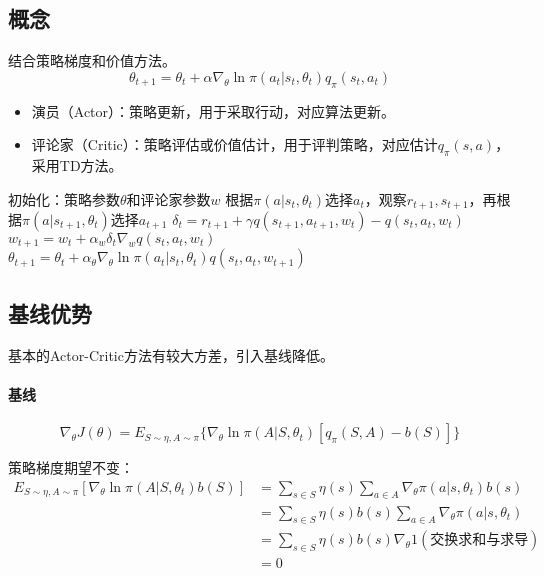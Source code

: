 \documentclass[
12pt, %
a4paper, 
oneside, %
headinclude,footinclude, %
]{scrartcl}
\begin{document}
\subsection[概念]{概念}
结合策略梯度和价值方法。
$$ \theta_{t + 1} = \theta_t + \alpha \nabla_\theta \ln \pi(a_t|s_t, \theta_t) q_\pi(s_t, a_t) $$
\begin{itemize}
\item 演员（Actor）：策略更新，用于采取行动，对应算法更新。
\item 评论家（Critic）：策略评估或价值估计，用于评判策略，对应估计$ q_{\pi}(s, a) $，采用TD方法。
\end{itemize}
\begin{myalgorithm}[QAC]
\State 初始化：策略参数$ \theta $和评论家参数$ w $
\State 根据$ \pi(a|s_t, \theta_t) $选择$ a_t $，观察$ r_{t + 1}, s_{t + 1} $，再根据$ \pi(a|s_{t + 1}, \theta_t) $选择$ a_{t + 1} $
\State $ \delta_t = r_{t + 1} + \gamma q(s_{t + 1}, a_{t + 1}, w_t) - q(s_t, a_t, w_t) $ 
\State $ w_{t + 1} = w_t + \alpha_w \delta_t \nabla_w q(s_t, a_t, w_t) $ 
\State $ \theta_{t + 1} = \theta_t + \alpha_\theta \nabla_\theta \ln \pi(a_t|s_t, \theta_t) q(s_t, a_t, w_{t + 1}) $ 
\EndFor
\EndFor
\end{myalgorithm}
\subsection[基线优势]{基线优势}
基本的Actor-Critic方法有较大方差，引入基线降低。
\paragraph{基线}
$$ \nabla_\theta J(\theta) = E_{S \sim \eta, A \sim \pi}\{\nabla_\theta \ln \pi(A|S, \theta_t) [q_\pi(S, A) - b(S)]\} $$

策略梯度期望不变：
\begin{align*}
E_{S\sim\eta,A\sim\pi}[\nabla_\theta\ln\pi(A|S,\theta_t)b(S)] &= \sum_{s \in S} \eta(s) \sum_{a \in A} \nabla_\theta\pi(a|s,\theta_t)b(s) \\
&= \sum_{s \in S} \eta(s) b(s) \sum_{a\in A} \nabla_\theta\pi(a|s,\theta_t) \\
&= \sum_{s \in S} \eta(s) b(s) \nabla_\theta 1 (\text{交换求和与求导}) \\
&= 0
\end{align*}
\end{document}
